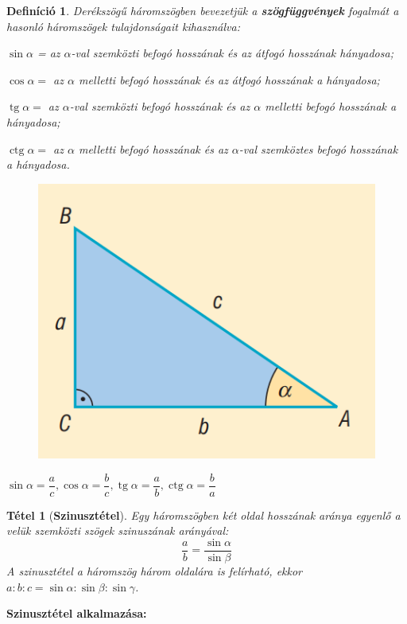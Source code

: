 \documentclass[12pt,a4paper]{article}
\newtheorem{theorem}{Tétel} [section]
\newtheorem{definition}{Definíció} [section]
\DeclareMathOperator{\tg}{tg}
\DeclareMathOperator{\ctg}{ctg}
\begin{document}
\begin{definition}
Derékszögű háromszögben bevezetjük a \textbf{szögfüggvények} fogalmát a hasonló háromszögek tulajdonságait kihasználva:

$\sin\alpha$ = az $\alpha$-val szemközti befogó hosszának és az átfogó hosszának hányadosa;

$\cos\alpha =$ az $\alpha$ melletti befogó hosszának és az átfogó hosszának a hányadosa;

$\tg \alpha =$ az $\alpha$-val szemközti befogó hosszának és az $\alpha$ melletti befogó hosszának a hányadosa;

$\ctg\alpha =$ az $\alpha$ melletti befogó hosszának és az $\alpha$-val szemköztes befogó hosszának a hányadosa.
\begin{figure}[h]
\centering
\includegraphics[scale=0.3]{geometry/derekszogu}
\end{figure}

\centering
$\sin\alpha=\dfrac{a}{c}, \cos\alpha=\dfrac{b}{c}, \tg\alpha=\dfrac{a}{b}, \ctg\alpha=\dfrac{b}{a}$
\end{definition}

\begin{theorem} [\textbf{Szinusztétel}]
Egy háromszögben két oldal hosszának aránya egyenlő a velük szemközti szögek szinuszának arányával:
$$\dfrac{a}{b}=\dfrac{\sin \alpha}{\sin \beta}$$
A szinusztétel a háromszög három oldalára is felírható, ekkor $a : b : c = \sin \alpha : \sin \beta : \sin \gamma$.
\end{theorem}

\textbf{Szinusztétel alkalmazása:}
\end{document}
